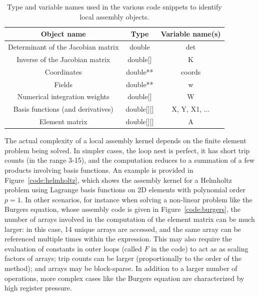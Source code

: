 \documentclass[conference]{IEEEtran}
\begin{document}
\begin{table}[h]
\begin{center}
\begin{tabulary}{1.0\columnwidth}{|C|C|C|}
\hline
Object name & Type & Variable name(s) \\\hline\hline
Determinant of the Jacobian matrix & double & det  \\ \hline
Inverse of the Jacobian matrix & double[] & K \\ \hline
Coordinates & double** & coords\\ \hline
Fields & double** & w \\ \hline
Numerical integration weights & double[] & W \\ \hline
Basis functions (and derivatives) & double[][] & X, Y, X1, ... \\ \hline
Element matrix & double[][] & A\\ \hline
\end{tabulary}
\end{center}
\caption{Type and variable names used in the various code snippets to identify local assembly objects.}
\label{table:map-name-letters}
\end{table}

The actual complexity of a local assembly kernel depends on the finite element problem being solved. In simpler cases, the loop nest is perfect, it has short trip counts (in the range 3-15), and the computation reduces to a summation of a few products involving basis functions. An example is provided in Figure~\ref{code:helmholtz}, which shows the assembly kernel for a Helmholtz problem using Lagrange basis functions on 2D elements with polynomial order $p=1$. In other scenarios, for instance when solving a non-linear problem like the Burgers equation, whose assembly code is given in Figure~\ref{code:burgers}, the number of arrays involved in the computation of the element matrix can be much larger: in this case, 14 unique arrays are accessed, and the same array can be referenced multiple times within the expression. This may also require the evaluation of constants in outer loops (called $F$ in the code) to act as as scaling factors of arrays; trip counts can be larger (proportionally to the order of the method); and arrays may be block-sparse. In addition to a larger number of operations, more complex cases like the Burgers equation are characterized by high register pressure. 
\end{document}
